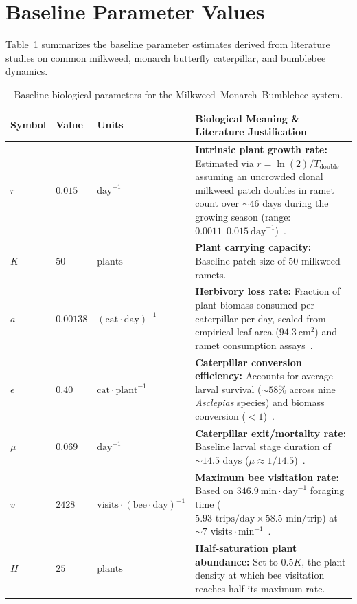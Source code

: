 \documentclass[11pt]{article}
\begin{document}
\section{Baseline Parameter Values}
Table~\ref{tab:parameters} summarizes the baseline parameter estimates derived from literature studies on common milkweed, monarch butterfly caterpillar, and bumblebee dynamics.

\begin{table}[htbp]
\centering
\caption{Baseline biological parameters for the Milkweed--Monarch--Bumblebee system.}
\label{tab:parameters}
\renewcommand{\arraystretch}{1.35}
\begin{tabularx}{\textwidth}{@{} l l l >{\raggedright\arraybackslash}X @{}}
\toprule
\textbf{Symbol} & \textbf{Value} & \textbf{Units} & \textbf{Biological Meaning \& Literature Justification} \\
\midrule
$r$ & $0.015$ & $\text{day}^{-1}$ & \textbf{Intrinsic plant growth rate:} Estimated via $r = \ln(2)/T_{\text{double}}$ assuming an uncrowded clonal milkweed patch doubles in ramet count over $\sim 46\text{ days}$ during the growing season (range: $0.0011\text{--}0.015\ \text{day}^{-1}$)~\cite{xerces2018}. \\
$K$ & $50$ & $\text{plants}$ & \textbf{Plant carrying capacity:} Baseline patch size of 50 milkweed ramets. \\
$a$ & $0.00138$ & $(\text{cat}\cdot\text{day})^{-1}$ & \textbf{Herbivory loss rate:} Fraction of plant biomass consumed per caterpillar per day, scaled from empirical leaf area ($94.3\ \text{cm}^2$) and ramet consumption assays~\cite{machado2023, grant2022, neupane2026}. \\
$\epsilon$ & $0.40$ & $\text{cat}\cdot\text{plant}^{-1}$ & \textbf{Caterpillar conversion efficiency:} Accounts for average larval survival ($\sim 58\%$ across nine \textit{Asclepias} species) and biomass conversion ($<1$)~\cite{pocius2018}. \\
$\mu$ & $0.069$ & $\text{day}^{-1}$ & \textbf{Caterpillar exit/mortality rate:} Baseline larval stage duration of $\sim 14.5\text{ days}$ ($\mu \approx 1/14.5$)~\cite{pocius2018}. \\
$v$ & $2428$ & $\text{visits}\cdot(\text{bee}\cdot\text{day})^{-1}$ & \textbf{Maximum bee visitation rate:} Based on $346.9\ \text{min}\cdot\text{day}^{-1}$ foraging time ($5.93\text{ trips/day} \times 58.5\text{ min/trip}$) at $\sim 7\text{ visits}\cdot\text{min}^{-1}$~\cite{minahan2018}. \\
$H$ & $25$ & $\text{plants}$ & \textbf{Half-saturation plant abundance:} Set to $0.5K$, the plant density at which bee visitation reaches half its maximum rate. \\

\end{tabularx}
\end{table}
\end{document}
